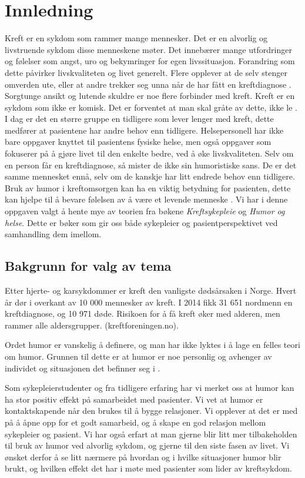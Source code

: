 \chapter{Innledning}

Kreft er en sykdom som rammer mange mennesker. Det er en alvorlig og
livstruende sykdom disse menneskene møter. Det innebærer mange utfordringer og
følelser som angst, uro og bekymringer for egen livssituasjon. Forandring som
dette påvirker livskvaliteten og livet generelt. Flere opplever at de selv
stenger omverden ute, eller at andre trekker seg unna når de har fått en
kreftdiagnose \cite[s.~39-47]{rustoen2008}. Sorgtunge ansikt og lutende skuldre
er noe flere forbinder med kreft. Kreft er en sykdom som ikke er komisk. Det er
forventet at man skal gråte av dette, ikke le \cite[s.~161-162]{tyrdal2002}.  I
dag er det en større gruppe en tidligere som lever lenger med kreft, dette
medfører at pasientene har andre behov enn tidligere. Helsepersonell har ikke
bare oppgaver knyttet til pasientens fysiske helse, men også oppgaver som
fokuserer på å gjøre livet til den enkelte bedre, ved å øke livskvaliteten.
Selv om en person får en kreftdiagnose, så mister de ikke sin humoristiske
sans. De er det samme mennesket ennå, selv om de kanskje har litt endrede behov
enn tidligere. Bruk av humor i kreftomsorgen kan ha en viktig betydning for
pasienten, dette kan hjelpe til å bevare følelsen av å være et levende menneske
\cite[s.~163]{tyrdal2002}. Vi har i denne oppgaven valgt å hente mye av teorien
fra bøkene \textit{Kreftsykepleie} og \textit{Humor og helse}. Dette er bøker
som gir oss både sykepleier og pasientperspektivet ved samhandling dem imellom.

\section{Bakgrunn for valg av tema}

Etter hjerte- og karsykdommer er kreft den vanligste dødsårsaken i Norge. Hvert
år dør i overkant av 10 000 mennesker av kreft. I 2014 fikk 31 651 nordmenn en
kreftdiagnose, og 10 971 døde. Risikoen for å få kreft
øker med alderen, men rammer alle aldersgrupper. (kreftforeningen.no).

Ordet humor er vanskelig å definere, og man har ikke lyktes i å lage en felles
teori om humor. Grunnen til dette er at humor er noe personlig og avhenger av
individet og situasjonen det befinner seg i \cite{tyrdal2002}.

Som sykepleierstudenter og fra tidligere erfaring har vi merket oss at humor
kan ha stor positiv effekt på samarbeidet med pasienter. Vi vet at humor er
kontaktskapende når den brukes til å bygge relasjoner. Vi opplever at det er
med på å åpne opp for et godt samarbeid, og å skape en god relasjon mellom
sykepleier og pasient. Vi har også erfart at man gjerne blir litt mer
tilbakeholden til bruk av humor ved alvorlig sykdom, og gjerne til den siste
fasen av livet. Vi ønsket derfor å se litt nærmere på hvordan og i hvilke
situasjoner humor blir brukt, og hvilken effekt det har i møte med pasienter
som lider av kreftsykdom.

